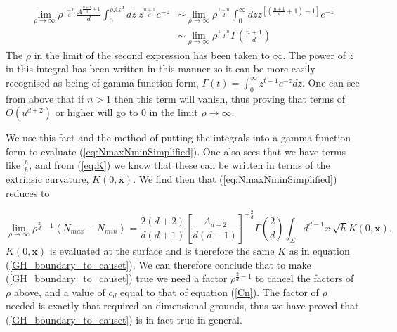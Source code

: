 \documentclass[12pt]{article}
\newcommand{\be}{\begin{equation}}
\newcommand{\ee}{\end{equation}}
\begin{document}
\be\begin{aligned}\label{eq:GammaVanishingOrderIntegral}
\lim_{\rho \to \infty}\rho^{\frac{1-n}{d}}\frac{A^{\frac{n+1}{d}+1}}{d}\int_{0}^{\rho A\varepsilon^d}dz\
z^{\frac{n+1}{d}}e^{-z}
&\sim\lim_{\rho \to \infty}\rho^{\frac{1-n}{d}}\int_{0}^{\infty}dz
z^{\left[\left(\frac{n+1}{d}+1\right)-1 \right]}e^{-z}\\
&\sim\lim_{\rho \to \infty}\rho^{\frac{1-n}{d}}\Gamma\left(\frac{n+1}{d}\right)
\end{aligned}
\ee
The $\rho$ in the limit of the second expression has been taken to $\infty$. The power of $z$ in this integral has been written in this manner so it can be more easily recognised as being of gamma function form, $\Gamma(t)=\int_{0}^{\infty}z^{t-1}e^{-z}dz$. One can see from above that if $n>1$ then this term will vanish, thus proving that terms of $O(u^{d+2})$ or higher will go to $0$ in the limit $\rho\rightarrow\infty$.

We use this fact and the method of putting the integrals into a gamma function form to evaluate (\ref{eq:NmaxNminSimplified}). One also sees that we have terms like $\frac{\dot{h}}{h}$, and from (\ref{eq:K}) we know that these can be written in terms of the extrinsic curvature, $K(0,\mathbf{x})$. We find then that (\ref{eq:NmaxNminSimplified}) reduces to

\be\label{eq:nmax_eq:nmin_end}
\lim_{\rho \to \infty}\rho^{\frac{2}{d}-1}\left\langle N_{max}-N_{min} \right\rangle=
\frac{2(d+2)}{d(d+1)}
\left[\frac{A_{d-2}}{d(d-1)}\right]^{-\frac{2}{d}}
\Gamma\left(\frac{2}{d}\right)\int_{\Sigma}d^{d-1}x\
\sqrt{h}K(0,\mathbf{x}).
\ee
$K(0,\mathbf{x})$ is evaluated at the surface and is therefore the same $K$ as in equation (\ref{GH_boundary_to_causet}). We can therefore conclude that to make (\ref{GH_boundary_to_causet}) true we need a factor $\rho^{\frac{2}{d}-1}$ to cancel the factors of $\rho$ above, and a value of $c_d$ equal to that of equation (\ref{Cn}). The factor of $\rho$ needed is exactly that required on dimensional grounds, thus we have proved that (\ref{GH_boundary_to_causet}) is in fact true in general.
\end{document}
